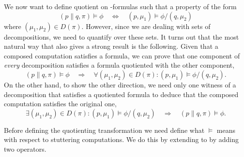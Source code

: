 We now want to define quotient on \HMLpast-formulas such that a property of the
form
\[
    (p\parallel q, \pi) \vDash \phi  \quad\Leftrightarrow\quad
    (p, \mu_1) \vDash \phi/(q, \mu_2)
\]
where $(\mu_1,\mu_2) \in D(\pi)$. However, since we are dealing with sets of
decompositions, we need to quantify over these sets. It turns out that the most
natural way that also gives a strong result is the following. Given that a composed
computation satisfies a formula, we can prove that one component of {\em every}
decomposition satisfies a formula quotiented with the other component,
\[
    (p\parallel q, \pi) \vDash \phi  \quad\Rightarrow\quad
    \forall (\mu_1,\mu_2) \in D(\pi) : (p, \mu_1) \vDash \phi/(q, \mu_2).
\]
On the other hand, to show the other direction, we need only one witness of a
decomposition that satisfies a quotiented formula to deduce that the composed
computation satisfies the original one,
\[
    \exists (\mu_1,\mu_2) \in D(\pi) : (p, \mu_1) \vDash \phi/(q, \mu_2)
    \quad\Rightarrow\quad
    (p\parallel q, \pi) \vDash \phi.
\]

Before defining the quotienting transformation we need define what $\vDash$ 
means with respect to stuttering computations.
We do this by extending \HMLpast{} to \HMLpp by adding
two operators.

